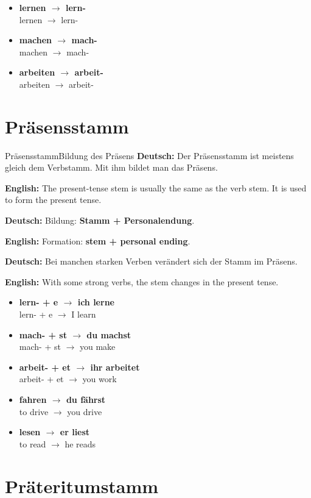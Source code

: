 \documentclass[a4paper,11pt]{article}
\newcommand{\GermanText}[1]{\textbf{Deutsch: }#1\par}
\newcommand{\EnglishText}[1]{{\small\color{SoftGray}\textbf{English: }#1\par}}
\newcommand{\ExampleItem}[2]{\item \textbf{#1}\\{\small\color{SoftGray}#2}}
\begin{document}
        \begin{exbox}
            \begin{itemize}
                \ExampleItem{lernen $\rightarrow$ lern-}{lernen $\rightarrow$ lern-}
                \ExampleItem{machen $\rightarrow$ mach-}{machen $\rightarrow$ mach-}
                \ExampleItem{arbeiten $\rightarrow$ arbeit-}{arbeiten $\rightarrow$ arbeit-}
            \end{itemize}
        \end{exbox}

    \section{Präsensstamm}

        \begin{grammarentry}{Präsensstamm}{Bildung des Präsens}
            \GermanText{Der Präsensstamm ist meistens gleich dem Verbstamm. Mit ihm bildet man das Präsens.}
            \EnglishText{The present-tense stem is usually the same as the verb stem. It is used to form the present tense.}

            \GermanText{Bildung: \textbf{Stamm + Personalendung}.}
            \EnglishText{Formation: \textbf{stem + personal ending}.}

            \GermanText{Bei manchen starken Verben verändert sich der Stamm im Präsens.}
            \EnglishText{With some strong verbs, the stem changes in the present tense.}
        \end{grammarentry}

        \begin{exbox}
            \begin{itemize}
                \ExampleItem{lern- + e $\rightarrow$ ich lerne}{lern- + e $\rightarrow$ I learn}
                \ExampleItem{mach- + st $\rightarrow$ du machst}{mach- + st $\rightarrow$ you make}
                \ExampleItem{arbeit- + et $\rightarrow$ ihr arbeitet}{arbeit- + et $\rightarrow$ you work}
                \ExampleItem{fahren $\rightarrow$ du fährst}{to drive $\rightarrow$ you drive}
                \ExampleItem{lesen $\rightarrow$ er liest}{to read $\rightarrow$ he reads}
            \end{itemize}
        \end{exbox}

    \section{Präteritumstamm}
\end{document}
